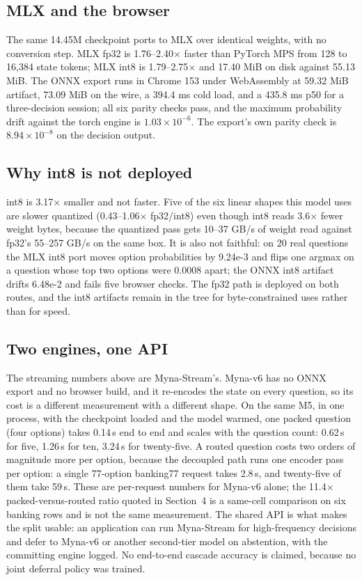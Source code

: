 \documentclass[11pt]{article}
\begin{document}
\subsection{MLX and the browser}
The same 14.45M checkpoint ports to MLX over identical weights, with no conversion step. MLX fp32
is 1.76--2.40$\times$ faster than PyTorch MPS from 128 to 16{,}384 state tokens; MLX int8 is
1.79--2.75$\times$ and 17.40 MiB on disk against 55.13 MiB. The ONNX export runs in Chrome 153
under WebAssembly at 59.32 MiB artifact, 73.09 MiB on the wire, a 394.4 ms cold load, and a 435.8
ms p50 for a three-decision session; all six parity checks pass, and the maximum probability drift
against the torch engine is $1.03\times10^{-6}$. The export's own parity check is
$8.94\times10^{-8}$ on the decision output.

\subsection{Why int8 is not deployed}
int8 is 3.17$\times$ smaller and not faster. Five of the six linear shapes this model uses are
slower quantized (0.43--1.06$\times$ fp32/int8) even though int8 reads 3.6$\times$ fewer weight
bytes, because the quantized pass gets 10--37 GB/s of weight read against fp32's 55--257 GB/s on
the same box. It is also not faithful: on 20 real questions the MLX int8 port moves option
probabilities by 9.24e-3 and flips one argmax on a question whose top two options were 0.0008
apart; the ONNX int8 artifact drifts 6.48e-2 and fails five browser checks. The fp32 path is deployed on
both routes, and the int8 artifacts remain in the tree for byte-constrained uses rather than for
speed.

\subsection{Two engines, one API}
The streaming numbers above are Myna-Stream{}'s. Myna-v6{} has no ONNX export and no browser build, and
it re-encodes the state on every question, so its cost is a different measurement with a different
shape. On the same M5, in one process, with the checkpoint loaded and the model warmed, one packed
question (four options) takes 0.14\,s end to end and scales with the question count: 0.62\,s for
five, 1.26\,s for ten, 3.24\,s for twenty-five. A routed question costs two orders of magnitude
more per option, because the decoupled path runs one encoder pass per option: a single 77-option
banking77 request takes 2.8\,s, and twenty-five of them take 59\,s. These are per-request numbers
for Myna-v6{} alone; the 11.4$\times$ packed-versus-routed ratio quoted in
Section~4 is a same-cell comparison on six banking rows and is not the same
measurement.
The shared API is what makes the split usable: an application can run Myna-Stream{} for high-frequency
decisions and defer to Myna-v6{} or another second-tier model on abstention, with the committing
engine logged. No end-to-end cascade accuracy is claimed, because no joint deferral policy was
trained.
\end{document}
